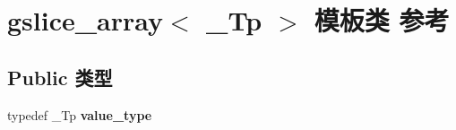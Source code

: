\hypertarget{classgslice__array}{}\section{gslice\+\_\+array$<$ \+\_\+\+Tp $>$ 模板类 参考}
\label{classgslice__array}
\subsection*{Public 类型}
\begin{DoxyCompactItemize}
\item 
\mbox{\label{classgslice__array_aec436707e08c8f781054ed5d2cd981ea}} 
typedef \+\_\+\+Tp {\bfseries value\+\_\+type}
\end{DoxyCompactItemize}
